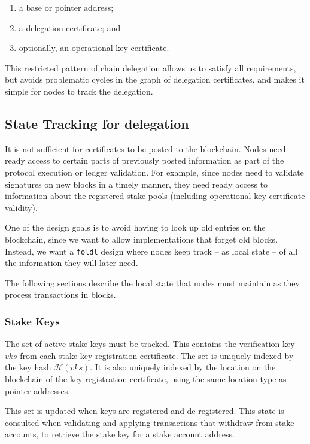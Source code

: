 \documentclass[11pt,a4paper]{article}
\begin{document}
\begin{enumerate}
\item
  a base or pointer address;
\item
  a delegation certificate; and
\item
  optionally, an operational key certificate.
\end{enumerate}

This restricted pattern of chain delegation allows us to satisfy all
requirements, but avoids problematic cycles in the graph of delegation
certificates, and makes it simple for nodes to track the delegation.

\subsection{State Tracking for delegation}
\label{state-tracking-for-delegation}

It is not sufficient for certificates to be posted to the blockchain.
Nodes need ready access to certain parts of previously posted
information as part of the protocol execution or ledger validation. For
example, since nodes need to validate signatures on new blocks in a
timely manner, they need ready access to information about the registered
stake pools (including operational key certificate validity).

One of the design goals is to avoid having to look up old entries on the
blockchain, since we want to allow implementations that forget old
blocks. Instead, we want a {\tt foldl} design where nodes keep track -- as
local state -- of all the information they will later need.

The following sections describe the local state that nodes must maintain
as they process transactions in blocks.

\subsubsection{Stake Keys}
\label{stake-keys}

The set of active stake keys must be tracked. This contains the
verification key \(vks\) from each stake key registration certificate.
The set is uniquely indexed by the key hash \(\mathcal{H}(vks)\). It is
also uniquely indexed by the location on the blockchain of the key
registration certificate, using the same location type as pointer
addresses.

This set is updated when keys are registered and de-registered. This
state is consulted when validating and applying transactions that
withdraw from stake accounts, to retrieve the stake key for a stake
account address.
\end{document}
